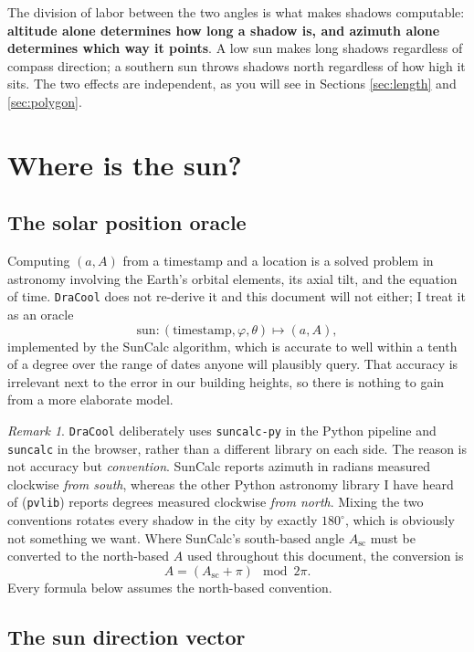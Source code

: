 \documentclass[11pt,a4paper]{article}
\theoremstyle{plain}
\theoremstyle{definition}
\theoremstyle{remark}
\newtheorem{remark}{Remark}
\begin{document}
The division of labor between the two angles is what makes shadows computable: \textbf{altitude alone determines how long a shadow is, and azimuth alone determines which way it points}. A low sun makes long shadows regardless of compass direction; a southern sun throws shadows north regardless of how high it sits. The two effects are independent, as you will see in Sections \ref{sec:length} and \ref{sec:polygon}.

\section{Where is the sun?}
\label{sec:sun}

\subsection{The solar position oracle}

Computing $(a, A)$ from a timestamp and a location is a solved problem in astronomy involving the Earth's orbital elements, its axial tilt, and the equation of time. \texttt{DraCool} does not re-derive it and this document will not either; I treat it as an oracle
$$\mathrm{sun}: (\text{timestamp}, \varphi, \theta) \longmapsto (a, A),$$
implemented by the SunCalc algorithm, which is accurate to well within a tenth of a degree over the range of dates anyone will plausibly query. That accuracy is irrelevant next to the error in our building heights, so there is nothing to gain from a more elaborate model.

\begin{remark}
\label{rem:convention}
\texttt{DraCool} deliberately uses \texttt{suncalc-py} in the Python pipeline and \texttt{suncalc} in the browser, rather than a different library on each side. The reason is not accuracy but \emph{convention}. SunCalc reports azimuth in radians measured clockwise \emph{from south}, whereas the other Python astronomy library I have heard of (\texttt{pvlib}) reports degrees measured clockwise \emph{from north}. Mixing the two conventions rotates every shadow in the city by exactly $180^\circ$, which is obviously not something we want. Where SunCalc's south-based angle $A_{\mathrm{sc}}$ must be converted to the north-based $A$ used throughout this document, the conversion is
$$A = (A_{\mathrm{sc}} + \pi) \mod{2\pi}.$$
Every formula below assumes the north-based convention.
\end{remark}

\subsection{The sun direction vector}
\end{document}
